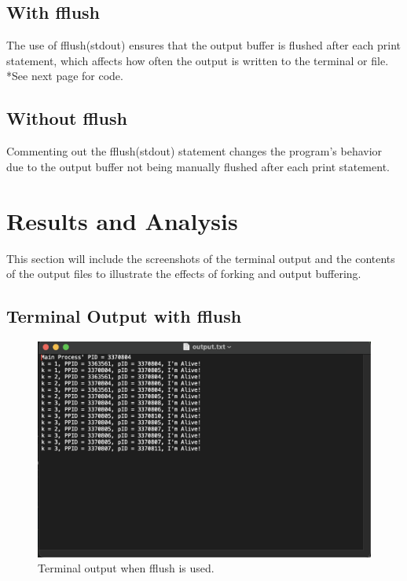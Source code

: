 \documentclass[12pt]{article}
\begin{document}
\newpage
  \subsection{With fflush}
The use of fflush(stdout) ensures that the output buffer is flushed after each print statement, which affects how often the output is written to the terminal or file. *See next page for code. 



\subsection{Without fflush}
Commenting out the fflush(stdout) statement changes the program's behavior due to the output buffer not being manually flushed after each print statement.



\newpage
  \section{Results and Analysis}
This section will include the screenshots of the terminal output and the contents of the output files to illustrate the effects of forking and output buffering.

\subsection{Terminal Output with fflush}
\begin{figure}[h]
\centering
\includegraphics[width=\textwidth]{output_with_fflush.png}
\caption{Terminal output when fflush is used.}
\end{figure}
\end{document}
